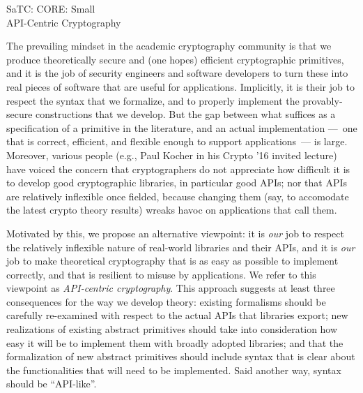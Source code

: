 \documentclass[10pt]{article}
\begin{document}
\thispagestyle{empty}

\begin{center}
{\Large SaTC: CORE: Small }\\ 
{\Large API-Centric Cryptography\\} 
\end{center}

\noindent
The prevailing mindset in the academic cryptography community is that
we produce theoretically secure and (one hopes) efficient
cryptographic primitives, and it is the job of security engineers and
software developers to turn these into real pieces of software that
are useful for applications.  Implicitly, it is their job to respect
the syntax that we formalize, and to properly implement the
provably-secure constructions that we develop.  But
the gap between what suffices as a
specification of a primitive in the literature, and an actual
implementation ---~one that is correct, efficient, and flexible enough
to support applications~--- is large.  Moreover, various 
people (e.g., Paul Kocher in his Crypto '16 invited lecture) have
voiced the concern that cryptographers do not appreciate how
difficult it is to develop good cryptographic libraries, in particular
good APIs; nor that APIs are relatively inflexible once fielded,
because changing them (say, to accomodate the latest crypto theory
results) wreaks havoc on applications that call them.

Motivated by this, we propose an alternative viewpoint: it is
\emph{our} job to respect the relatively inflexible nature of
real-world libraries and their APIs, and it is \emph{our} job to make
theoretical cryptography that is as easy as possible to implement
correctly, and that is resilient to misuse by applications. We refer to this viewpoint as
\emph{API-centric cryptography}.  This approach suggests at least
three consequences for the way we develop theory: existing formalisms
should be carefully re-examined with respect to the actual APIs that
libraries export; new realizations of existing abstract primitives
should take into consideration how easy it will be to implement them
with broadly adopted libraries; and that the formalization of new
abstract primitives should include syntax that is clear about the
functionalities that will need to be implemented. Said another way, syntax
should be ``API-like''.
\end{document}
